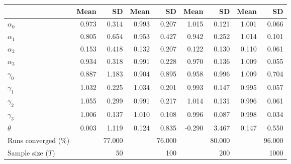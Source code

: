 
\begin{tabular}[t]{lrrrrrrrr}
\toprule
  & Mean & SD & Mean  & SD  & Mean   & SD   & Mean    & SD   \\
\midrule
$\alpha_{0}$ & 0.973 & 0.314 & 0.993 & 0.207 & 1.015 & 0.121 & 1.001 & 0.066\\
$\alpha_{1}$ & 0.805 & 0.654 & 0.953 & 0.427 & 0.942 & 0.252 & 1.014 & 0.101\\
$\alpha_{2}$ & 0.153 & 0.418 & 0.132 & 0.207 & 0.122 & 0.130 & 0.110 & 0.061\\
$\alpha_{3}$ & 0.934 & 0.318 & 0.991 & 0.228 & 0.970 & 0.136 & 1.009 & 0.055\\
$\gamma_{0}$ & 0.887 & 1.183 & 0.904 & 0.895 & 0.958 & 0.996 & 1.009 & 0.704\\
$\gamma_{1}$ & 1.032 & 0.225 & 1.034 & 0.201 & 0.993 & 0.147 & 0.995 & 0.057\\
$\gamma_{2}$ & 1.055 & 0.299 & 0.991 & 0.217 & 1.014 & 0.131 & 0.996 & 0.061\\
$\gamma_{3}$ & 1.006 & 0.137 & 1.010 & 0.108 & 0.996 & 0.087 & 0.998 & 0.034\\
$\theta$ & 0.003 & 1.119 & 0.124 & 0.835 & -0.290 & 3.467 & 0.147 & 0.550\\
Runs converged (\%) &  & 77.000 &  & 76.000 &  & 80.000 &  & 96.000\\
Sample size ($T$) &  & 50 &  & 100 &  & 200 &  & 1000\\
\bottomrule
\end{tabular}
